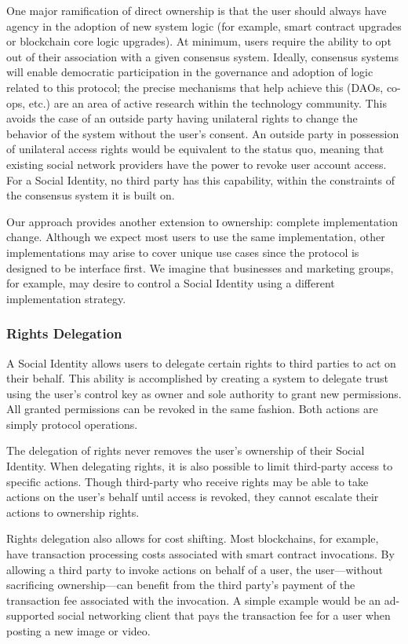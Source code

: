 \documentclass[12pt,letterpaper]{article}
\begin{document}
One major ramification of direct ownership is that the user should always have agency in the
adoption of new system logic (for example, smart contract upgrades or blockchain core logic
upgrades). At minimum, users require the ability to opt out of their association with a
given consensus system. Ideally, consensus systems will enable democratic participation in
the governance and adoption of logic related to this protocol; the precise mechanisms that
help achieve this (DAOs, co-ops, etc.) are an area of active research within the technology
community.  This avoids the case of an outside party having unilateral rights to change the
behavior of the system without the user's consent. An outside party in possession of
unilateral access rights would be equivalent to the status quo, meaning that existing social
network providers have the power to revoke user account access. For a Social Identity, no
third party has this capability, within the constraints of the consensus system it is built on.

Our  approach provides another extension to ownership: complete
implementation change. Although we expect most users to use the same implementation, other
implementations may arise to cover unique use cases since the protocol is designed to be
interface first. We imagine that businesses and marketing groups, for example, may desire to
control a Social Identity using a different implementation strategy.

\subsubsection{Rights Delegation}

A Social Identity allows users to delegate certain rights to third parties to act on their
behalf. This ability is accomplished by creating a system to delegate trust using the user's
control key as owner and sole authority to grant new permissions. All granted permissions
can be revoked in the same fashion. Both actions are simply protocol operations.

The delegation of rights never removes the user's ownership of their Social Identity. When
delegating rights, it is also possible to limit third-party access to specific actions.
Though third-party  who receive rights may be able to take actions on the
user's behalf until access is revoked, they cannot escalate their actions to ownership
rights.

Rights delegation also allows for cost shifting. Most blockchains, for example, have
transaction processing costs associated with smart contract invocations. By allowing a third
party to invoke actions on behalf of a user, the user---without sacrificing ownership---can
benefit from the third party's payment of the transaction fee associated with the
invocation. A simple example would be an ad-supported social networking client that pays the
transaction fee for a user when posting a new image or video.
\end{document}

